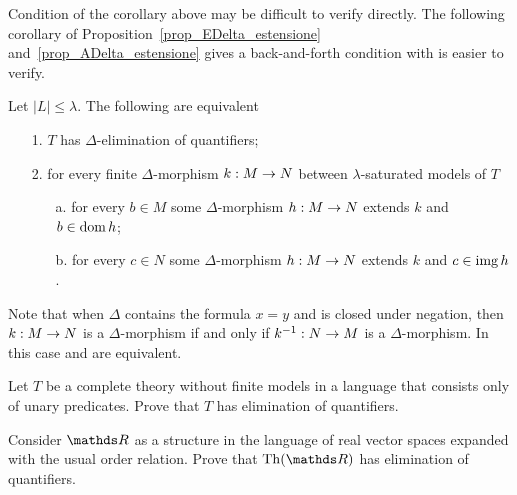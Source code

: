 Condition  of the corollary above may be difficult to verify directly. The following corollary of Proposition~\ref{prop_EDelta_estensione} and~\ref{prop_ADelta_estensione} gives a back-and-forth condition with is easier to verify.

\begin{corollary}\label{corol_QE_back_and_forth}
Let $|L|\le\lambda$. The following are equivalent
\begin{itemize}
\item[1.] $T$ has $\Delta$-elimination of quantifiers;
\item[2.] for every finite $\Delta$-morphism $k:M\rightarrow N$ between $\lambda$-saturated models of $T$
\begin{itemize}                                                                                               \item[a.] for every $b\in M$ some $\Delta$-morphism $h:M\rightarrow N$ extends $k$ and $b\in\mathop{\rm dom} h$;                                                                                \item[b.] for every $c\in N$ some $\Delta$-morphism $h:M\rightarrow N$ extends $k$ and $c\in\mathop{\rm img} h$.\noindent\nolinebreak[4]\hfill\rlap{\ \ $\Box$}                                                                   \end{itemize}
\end{itemize}
\end{corollary}

Note that when $\Delta$ contains the formula $x=y$ and is closed under negation, then  $k:M\rightarrow N$ is a $\Delta$-morphism if and only if $k^{-1}:N\rightarrow M$ is a $\Delta$-morphism. In this case  and  are equivalent.

\begin{exercise}
Let $T$ be a complete theory without finite models in a language that consists only of unary predicates. Prove that $T$ has elimination of quantifiers.\QED
\end{exercise}

\begin{exercise}
Consider $\RR$ as a structure in the language of real vector spaces expanded with the usual order relation. Prove that $\Th(\RR)$ has elimination of quantifiers.\QED
\end{exercise}

